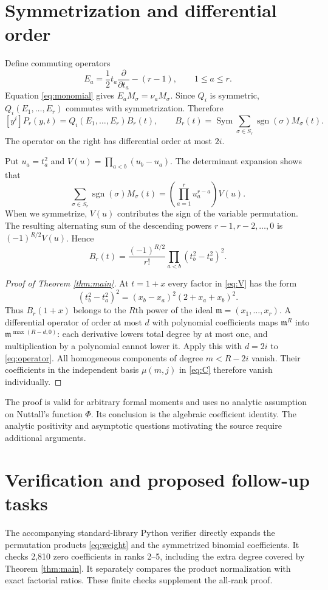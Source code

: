 \documentclass[11pt]{article}
\newcommand{\Sym}{\operatorname{Sym}}
\newcommand{\sgn}{\operatorname{sgn}}
\begin{document}
\section*{Symmetrization and differential order}
Define commuting operators
\[
 E_a=\frac12t_a\frac{\partial}{\partial t_a}-(r-1),
 \qquad 1\leq a\leq r.
\]
Equation \eqref{eq:monomial} gives $E_aM_\sigma=\nu_aM_\sigma$.
Since $Q_i$ is symmetric, $Q_i(E_1,\ldots,E_r)$ commutes with
symmetrization. Therefore
\begin{equation}\label{eq:operator}
 [y^i]P_r(y,t)=Q_i(E_1,\ldots,E_r)B_r(t),\qquad
 B_r(t)=\Sym\sum_{\sigma\in S_r}\sgn(\sigma)M_\sigma(t).
\end{equation}
The operator on the right has differential order at most $2i$.

Put $u_a=t_a^2$ and $V(u)=\prod_{a<b}(u_b-u_a)$. The determinant
expansion shows that
\[
 \sum_{\sigma\in S_r}\sgn(\sigma)M_\sigma(t)
 =\left(\prod_{a=1}^r u_a^{r-a}\right)V(u).
\]
When we symmetrize, $V(u)$ contributes the sign of the variable
permutation. The resulting alternating sum of the descending powers
$r-1,r-2,\ldots,0$ is $(-1)^{R/2}V(u)$. Hence
\begin{equation}\label{eq:V}
 B_r(t)=\frac{(-1)^{R/2}}{r!}\prod_{a<b}(t_b^2-t_a^2)^2.
\end{equation}

\begin{proof}[Proof of Theorem \ref{thm:main}]
At $t=1+x$ every factor in \eqref{eq:V} has the form
\[
 (t_b^2-t_a^2)^2=(x_b-x_a)^2(2+x_a+x_b)^2.
\]
Thus $B_r(1+x)$ belongs to the $R$th power of the ideal
$\mathfrak m=(x_1,\ldots,x_r)$. A differential operator of order at most
$d$ with polynomial coefficients maps $\mathfrak m^R$ into
$\mathfrak m^{\max(R-d,0)}$: each derivative lowers total degree by at
most one, and multiplication by a polynomial cannot lower it.
Apply this with $d=2i$ to \eqref{eq:operator}. All homogeneous components
of degree $m<R-2i$ vanish. Their coefficients in the independent basis
$\mu(m,j)$ in \eqref{eq:C} therefore vanish individually.
\end{proof}

The proof is valid for arbitrary formal moments and uses no analytic
assumption on Nuttall's function $\Phi$. Its conclusion is the algebraic
coefficient identity. The analytic positivity and asymptotic questions
motivating the source require additional arguments.

\section*{Verification and proposed follow-up tasks}
The accompanying standard-library Python verifier directly expands the
permutation products \eqref{eq:weight} and the symmetrized binomial
coefficients. It checks 2,810 zero coefficients in ranks 2--5, including
the extra degree covered by Theorem \ref{thm:main}. It separately compares
the product normalization with exact factorial ratios. These finite
checks supplement the all-rank proof.
\end{document}
